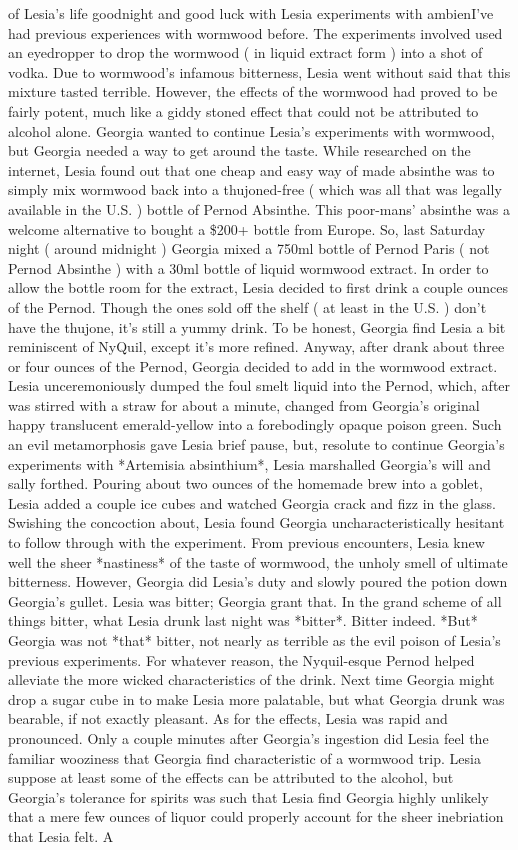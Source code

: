 \documentclass[12pt]{book}
\begin{document}
of Lesia's life goodnight and good luck with Lesia experiments with ambienI've had previous experiences with wormwood before. The experiments involved used an eyedropper to drop the wormwood ( in liquid extract form ) into a shot of vodka. Due to wormwood's infamous bitterness, Lesia went without said that this mixture tasted terrible. However, the effects of the wormwood had proved to be fairly potent, much like a giddy stoned effect that could not be attributed to alcohol alone. Georgia wanted to continue Lesia's experiments with wormwood, but Georgia needed a way to get around the taste. While researched on the internet, Lesia found out that one cheap and easy way of made absinthe was to simply mix wormwood back into a thujoned-free ( which was all that was legally available in the U.S. ) bottle of Pernod Absinthe. This poor-mans' absinthe was a welcome alternative to bought a \$200+ bottle from Europe. So, last Saturday night ( around midnight ) Georgia mixed a 750ml bottle of Pernod Paris ( not Pernod Absinthe ) with a 30ml bottle of liquid wormwood extract. In order to allow the bottle room for the extract, Lesia decided to first drink a couple ounces of the Pernod. Though the ones sold off the shelf ( at least in the U.S. ) don't have the thujone, it's still a yummy drink. To be honest, Georgia find Lesia a bit reminiscent of NyQuil, except it's more refined. Anyway, after drank about three or four ounces of the Pernod, Georgia decided to add in the wormwood extract. Lesia unceremoniously dumped the foul smelt liquid into the Pernod, which, after was stirred with a straw for about a minute, changed from Georgia's original happy translucent emerald-yellow into a forebodingly opaque poison green. Such an evil metamorphosis gave Lesia brief pause, but, resolute to continue Georgia's experiments with *Artemisia absinthium*, Lesia marshalled Georgia's will and sally forthed. Pouring about two ounces of the homemade brew into a goblet, Lesia added a couple ice cubes and watched Georgia crack and fizz in the glass. Swishing the concoction about, Lesia found Georgia uncharacteristically hesitant to follow through with the experiment. From previous encounters, Lesia knew well the sheer *nastiness* of the taste of wormwood, the unholy smell of ultimate bitterness. However, Georgia did Lesia's duty and slowly poured the potion down Georgia's gullet. Lesia was bitter; Georgia grant that. In the grand scheme of all things bitter, what Lesia drunk last night was *bitter*. Bitter indeed. *But* Georgia was not *that* bitter, not nearly as terrible as the evil poison of Lesia's previous experiments. For whatever reason, the Nyquil-esque Pernod helped alleviate the more wicked characteristics of the drink. Next time Georgia might drop a sugar cube in to make Lesia more palatable, but what Georgia drunk was bearable, if not exactly pleasant. As for the effects, Lesia was rapid and pronounced. Only a couple minutes after Georgia's ingestion did Lesia feel the familiar wooziness that Georgia find characteristic of a wormwood trip. Lesia suppose at least some of the effects can be attributed to the alcohol, but Georgia's tolerance for spirits was such that Lesia find Georgia highly unlikely that a mere few ounces of liquor could properly account for the sheer inebriation that Lesia felt. A 
\end{document}
